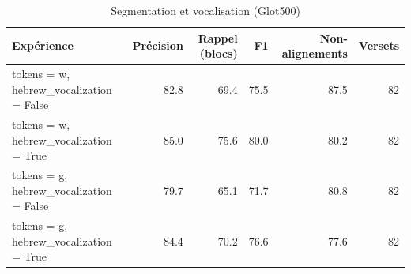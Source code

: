 \begin{table}[ht]
\centering
\caption{Segmentation et vocalisation (Glot500)}
\label{tab:segmentation_et_vocalisation_glot500}
\begin{tabular}{lrrrrr}
\toprule
Expérience & Précision & Rappel (blocs) & F1 & Non-alignements & Versets \\
\midrule
tokens = w, hebrew\_vocalization = False & 82.8 & 69.4 & 75.5 & 87.5 & 82 \\
tokens = w, hebrew\_vocalization = True & 85.0 & 75.6 & 80.0 & 80.2 & 82 \\
tokens = g, hebrew\_vocalization = False & 79.7 & 65.1 & 71.7 & 80.8 & 82 \\
tokens = g, hebrew\_vocalization = True & 84.4 & 70.2 & 76.6 & 77.6 & 82 \\
\bottomrule
\end{tabular}
\end{table}
